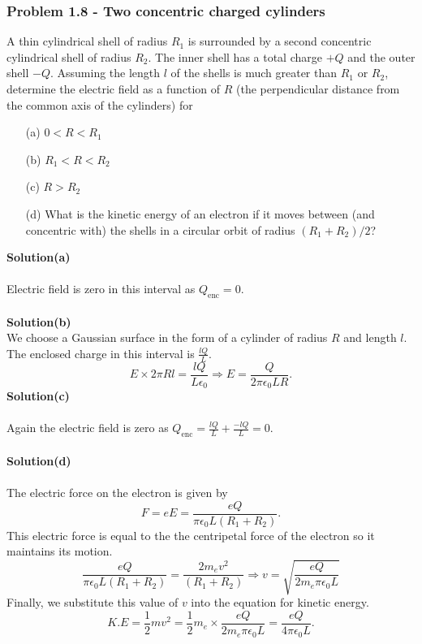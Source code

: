 \documentclass{article}
\begin{document}
\subsubsection*{Problem 1.8 - Two concentric charged cylinders}
A thin cylindrical shell of radius $R_1$ is surrounded by a
second concentric cylindrical shell of radius $R_2$.
The inner shell has a total charge $+Q$ and the outer 
shell $-Q$. Assuming the length $l$ of the shells is much greater
than $R_1$ or $R_2$, determine the electric field as a function of $R$ (the perpendicular distance from the common axis of the cylinders) for 
\begin{enumerate}
    \item[(a)]$0<R<R_1$
    \item[(b)]$R_1<R<R_2$
    \item[(c)]$R>R_2$
    \item[(d)]What is the kinetic energy of an electron if it moves between (and concentric with) the shells in a circular orbit of radius $(R_1+R_2)/2$?
\end{enumerate}
\textbf{Solution(a)}
\\
\\Electric field is zero in this interval as $Q_{\text{enc}}=0$.
\\
\\\textbf{Solution(b)}
\\We choose a Gaussian surface in the form of a cylinder of radius $R$ and length $l$. The enclosed charge in this interval is $\frac{lQ}{L}$.
\[E\times2\pi Rl=\frac{lQ}{L\epsilon_0}\Rightarrow E=\frac{Q}{2\pi\epsilon_0LR}.\]
\textbf{Solution(c)}
\\
\\Again the electric field is zero as $Q_{\text{enc}}=\frac{lQ}{L}+\frac{-lQ}{L}=0$.
\\
\\\textbf{Solution(d)}
\\
\\The electric force on the electron is given by
\[F=eE=\frac{eQ}{\pi\epsilon_0L(R_1+R_2)}.\]
This electric force is equal to the the centripetal force of the electron so it maintains its motion.
\[\frac{eQ}{\pi\epsilon_0L(R_1+R_2)}=\frac{2m_ev^2}{(R_1+R_2)}\Rightarrow v=\sqrt{\frac{eQ}{2m_e\pi\epsilon_0L}}\]
Finally, we substitute this value of $v$ into the equation for kinetic energy.
\[K.E=\frac{1}{2}mv^2=\frac{1}{2}m_e\times\frac{eQ}{2m_e\pi\epsilon_0L}=\frac{eQ}{4\pi\epsilon_0L}.\]
\end{document}
